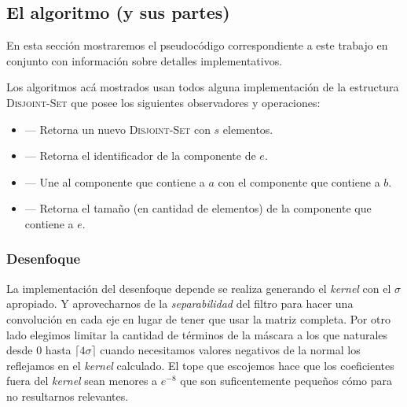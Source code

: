 \subsection{El algoritmo (y sus partes)}

En esta sección mostraremos el pseudocódigo correspondiente a este trabajo en
conjunto con información sobre detalles implementativos.

Los algoritmos acá mostrados usan todos alguna implementación de la estructura
\textsc{Disjoint-Set} que posee los siguientes observadores y operaciones:

\begin{itemize}
	\item {}
		--- Retorna un nuevo \textsc{Disjoint-Set} con $s$ elementos.
	\item {}
		--- Retorna el identificador de la componente de $e$.
	\item {}
		--- Une al componente que contiene a $a$ con el componente que
		contiene a $b$.
	\item {}
		--- Retorna el tamaño (en cantidad de elementos) de la
		componente que contiene a $e$.
\end{itemize}

\subsubsection{Desenfoque}

La implementación del desenfoque depende se realiza generando el \emph{kernel}
con el $\sigma$ apropiado. Y aprovecharnos de la \emph{separabilidad} del
filtro para hacer una convolución en cada eje en lugar de tener que usar la
matriz completa. Por otro lado elegimos limitar la cantidad de términos de la
máscara a los que naturales desde $0$ hasta $\lceil 4 \sigma \rceil$ cuando
necesitamos valores negativos de la normal los reflejamos en el \emph{kernel}
calculado. El tope que escojemos hace que los coeficientes fuera del
\emph{kernel} sean menores a $e^{-8}$ que son suficentemente pequeños cómo para
no resultarnos relevantes.

